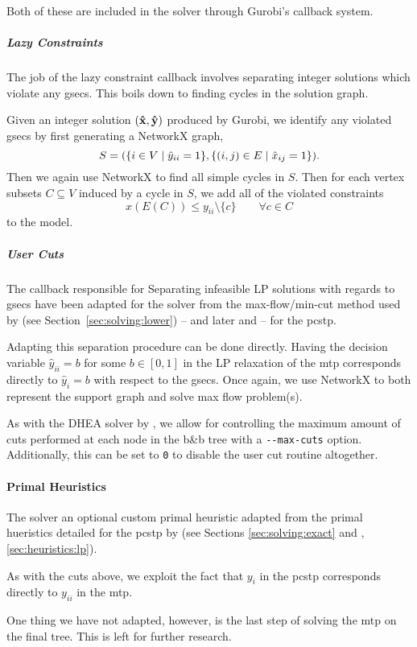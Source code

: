 Both of these are included in the solver through Gurobi's callback system.
\subparagraph{Lazy Constraints}
The job of the lazy constraint callback involves separating integer solutions
which violate any \glspl{gsec}. This boils down to finding cycles in the solution
graph.

Given an integer solution $(\mathbf{\hat{x}}, \mathbf{\hat{y}})$ produced by Gurobi, we
identify any violated \glspl{gsec} by first generating a NetworkX graph,
$$S = (\{i \in V \mid \hat y_{ii} = 1 \}, \{ (i, j) \in E \mid \hat x_{ij} = 1\})\mathnormal{.}$$
Then we again use NetworkX to find all simple cycles in $S$. Then for each vertex
subsets $C \subseteq V$ induced by a cycle
in $S$, we add all of the violated constraints
$$x(E(C)) \leq y_{ii} \setminus \{c\} \qquad \forall c \in C$$
to the model.
\subparagraph{User Cuts}
The callback responsible for
Separating infeasible LP solutions with regards to \glspl{gsec}
have been adapted for the solver from the max-flow/min-cut  method used by \citet{lucena2004strong}
 (see Section~\ref{sec:solving:lower})
-- and later \citet{ljubic2005solving} and \citet{gamrath2017scip} -- for the \gls{pcstp}.

Adapting this separation procedure can be done directly. Having the decision variable
$\hat y_{ii} = b$ for some $b \in [0,1]$ in the LP relaxation of
the \gls{mtp} corresponds directly to $\hat y_i = b$ with respect to the \glspl{gsec}.
Once again, we use NetworkX to both represent the support graph and solve max flow problem(s).

As with the DHEA solver by \citet{ljubic2005solving}, we allow for controlling the maximum amount
of cuts performed at each node in the b\&b tree
with a \texttt{-{}-max-cuts} option. Additionally, this can be set
to \texttt{0} to disable the user cut routine altogether.

\paragraph{Primal Heuristics}
The solver an optional custom primal heuristic adapted from the primal hueristics detailed
for the \gls{pcstp} by \citet{ljubic2005solving}
(see Sections \ref{sec:solving:exact} and , \ref{sec:heuristics:lp}).

As with the cuts above, we exploit the fact that $y_i$ in the \gls{pcstp}
corresponds directly to $y_{ii}$ in the \gls{mtp}.

One thing we have not adapted, however, is the last step of solving the \gls{mtp}
on the final tree. This is left for further research.

